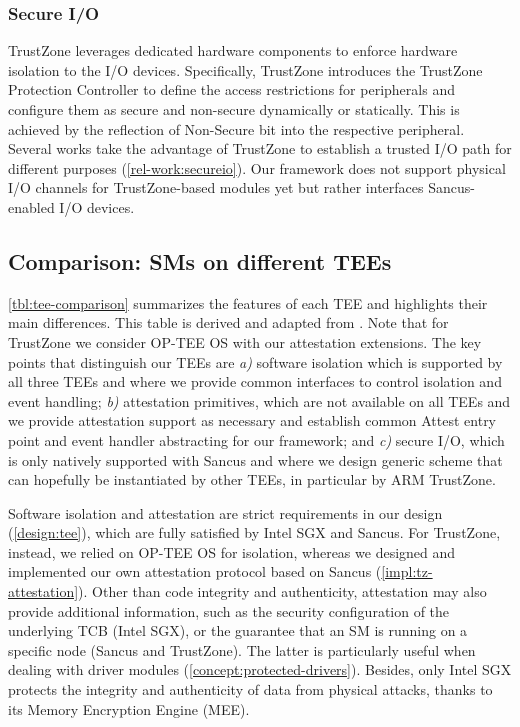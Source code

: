 \subsubsection{Secure I/O}
%
TrustZone leverages dedicated hardware components to enforce hardware isolation
to the I/O devices.  Specifically, TrustZone introduces the TrustZone Protection
Controller to define the access restrictions for peripherals and configure them
as secure and non-secure dynamically or statically. This is achieved by the
reflection of Non-Secure bit into the respective peripheral. Several works take
the advantage of TrustZone to establish a trusted I/O path for different
purposes \cite{TrustUI, ProtectedConfirmation, TrustOTP, TrustPay}
(\cref{rel-work:secureio}). Our framework does not support physical I/O
channels for TrustZone-based modules yet but rather interfaces Sancus-enabled
I/O devices.



\subsection{Comparison: \acp{SM} on different \acp{TEE}}
\label{impl:comparison}

\cref{tbl:tee-comparison} summarizes the features of each \ac{TEE} and
highlights their main differences. This table is derived and adapted from
\cite{maene:hardware}. Note that for TrustZone we consider OP-TEE OS with our
attestation extensions.
The key points that distinguish our \acp{TEE} are \emph{a)} software isolation
which is supported by all three \acp{TEE} and where we provide common
interfaces to control isolation and event handling;
\emph{b)} attestation primitives, which are not available on all \acp{TEE} and we 
provide attestation support as necessary and establish common Attest entry
point and event handler abstracting for our framework; and \emph{c)}
secure I/O, which is only natively supported with Sancus and where we
design generic scheme that can hopefully be instantiated by other
\acp{TEE}, in particular by ARM TrustZone.

Software isolation and attestation are strict requirements in our design
(\cref{design:tee}), which are fully satisfied by Intel \ac{SGX} and Sancus. For
TrustZone, instead, we relied on OP-TEE OS for isolation, whereas we designed
and implemented our own attestation protocol based on Sancus
(\cref{impl:tz-attestation}). Other than code integrity and authenticity,
attestation may also provide additional information, such as the security
configuration of the underlying TCB (Intel \ac{SGX}), or the guarantee that an
\ac{SM} is running on a specific node (Sancus and TrustZone). The latter is
particularly useful when dealing with driver modules
(\cref{concept:protected-drivers}). Besides, only Intel \ac{SGX} protects the
integrity and authenticity of data from physical attacks, thanks to its Memory
Encryption Engine (MEE).

